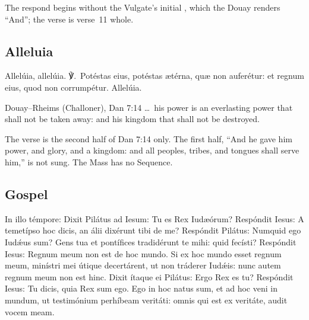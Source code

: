 \noindent The respond begins  without the Vulgate's initial
, which the Douay renders ``And''; the verse is verse~11 whole.

\subsection{Alleluia}
\label{proper-alleluia}


\begin{latinproper}
Allelúia, allelúia. ℣.~Potéstas eius, potéstas ætérna, quæ non auferétur: et
regnum eius, quod non corrumpétur. Allelúia.
\end{latinproper}

\begin{englishwitness}{Douay--Rheims (Challoner), Dan 7:14}
\dots\ his power is an everlasting power that shall not be taken away: and his
kingdom that shall not be destroyed.
\end{englishwitness}

\noindent The verse is the second half of Dan 7:14 only. The first half,
``And he gave him power, and glory, and a kingdom: and all peoples, tribes, and
tongues shall serve him,'' is not sung. The Mass has no Sequence.

\subsection{Gospel}
\label{proper-gospel}


\begin{latinproper}
In illo témpore: Dixit Pilátus ad Iesum: Tu es Rex Iudæórum? Respóndit Iesus:
A temetípso hoc dicis, an álii dixérunt tibi de me? Respóndit Pilátus: Numquid
ego Iudǽus sum? Gens tua et pontífices tradidérunt te mihi: quid fecísti?
Respóndit Iesus: Regnum meum non est de hoc mundo. Si ex hoc mundo esset regnum
meum, minístri mei útique decertárent, ut non tráderer Iudǽis: nunc autem regnum
meum non est hinc. Dixit ítaque ei Pilátus: Ergo Rex es tu? Respóndit Iesus: Tu
dicis, quia Rex sum ego. Ego in hoc natus sum, et ad hoc veni in mundum, ut
testimónium perhíbeam veritáti: omnis qui est ex veritáte, audit vocem meam.
\end{latinproper}

